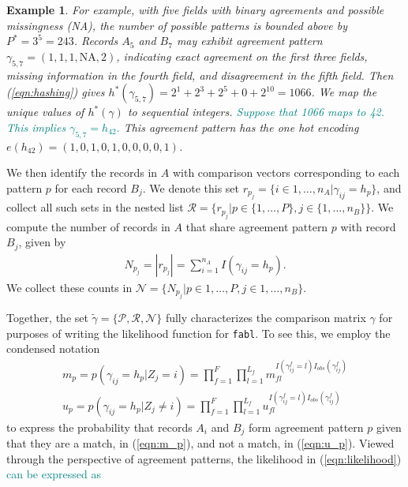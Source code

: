 \documentclass[ba]{imsart}
\newtheorem{example}{Example}
\begin{document}
\begin{example}
\label{ex:one-hot}
For example, with five fields with binary agreements and possible missingness (NA), the number of possible patterns is bounded above by $P^{*} = 3^5 = 243$. Records $A_5$ and $B_7$ may exhibit agreement pattern $\gamma_{5,7} = (1, 1, 1, \text{NA}, 2)$, indicating exact agreement on the first three fields, missing information in the fourth field, and disagreement in the fifth field. Then (\ref{eqn:hashing}) gives $h^{*}(\gamma_{5,7}) = 2^1 + 2^3 + 2^5 + 0 + 2^{10} = 1066$. We map the unique values of $h^{*}(\gamma)$ to sequential integers. \textcolor{teal}{Suppose that 1066 maps to 42. This implies $\gamma_{5,7} = h_{42}.$}
This agreement pattern has the one hot encoding $e(h_{42}) = (1, 0, 1, 0, 1, 0, 0, 0, 0, 1)$.
\end{example}

We then identify the records in $A$ with comparison vectors corresponding to each pattern $p$ for each record $B_j$. We denote this set $r_{p_j} = \{i \in 1, \dots, n_A | \gamma_{ij} = h_p\}$, and collect all such sets in the nested list $\mathcal{R} = \{r_{p_j} | p \in \{1, \ldots, P\}, j \in \{1, \ldots, n_B\} \}$. We compute the number of records in $A$ that share agreement pattern $p$ with record $B_j$, given by
\begin{align}\label{eqn:N}
N_{p_j} = |r_{p_j}| = \sum_{i=1}^{n_A} I(\gamma_{ij} = h_p).
\end{align}
We collect these counts in $\mathcal{N} = \{N_{p_j} |p \in 1, \ldots, P, j \in 1, \ldots, n_B \}$. 

Together, the set $\tilde{\gamma} = \{\mathcal{P}, \mathcal{R}, \mathcal{N}\}$ fully characterizes the comparison matrix $\gamma$ for purposes of writing the likelihood function for \texttt{fabl}. To see this, we employ the condensed notation
\begin{subequations}
	\begin{align}
		m_p =  p(\gamma_{ij} = h_p|Z_j = i) = \prod_{f=1}^{F}\prod_{l=1}^{L_f} m_{fl}^{I(\gamma_{ij}^f = l)I_{obs}(\gamma_{ij}^f)}\label{eqn:m_p} \\
		u_p =  p(\gamma_{ij} = h_p|Z_j \neq i) = \prod_{f=1}^{F}\prod_{l=1}^{L_f} u_{fl}^{I(\gamma_{ij}^f = l)I_{obs}(\gamma_{ij}^f)}\label{eqn:u_p}
	\end{align}
\end{subequations}
to express the probability that records $A_i$ and $B_j$ form agreement pattern $p$ given that they are a match, in (\ref{eqn:m_p}), and not a match, in (\ref{eqn:u_p}). Viewed through the perspective of agreement patterns, the likelihood in (\ref{eqn:likelihood}) \textcolor{teal}{can be expressed as}
\end{document}
